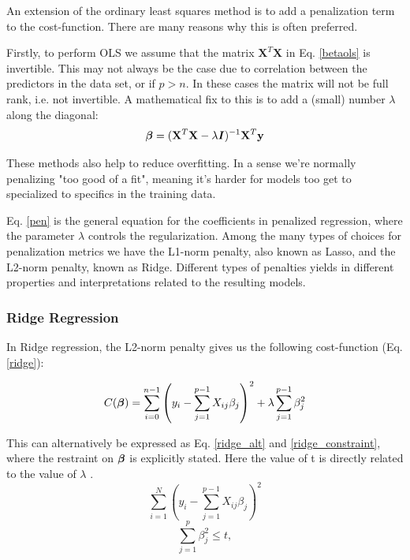 An extension of the ordinary least squares method is to add a penalization term to the cost-function. There are many reasons why this is often preferred. 

Firstly, to perform OLS we assume that the matrix $\boldsymbol{X}^T\boldsymbol{X}$ in Eq. \ref{betaols} is invertible. This may not always be the case due to correlation between the predictors in the data set, or if $p > n$. In these cases the matrix will not be full rank, i.e. not invertible. 
A mathematical fix to this is to add a (small) number $\lambda$ along the diagonal: 
\begin{equation}\label{pen}
    \boldsymbol{\beta} = (\mathbf{X}^T\mathbf{X}- \lambda\boldsymbol{I})^{-1}\mathbf{X}^T\mathbf{y}
\end{equation}

These methods also help to reduce overfitting.  In a sense we're normally penalizing "too good of a fit", meaning it's harder for models too get to specialized to specifics in the training data.

Eq. \ref{pen} is the general equation for the coefficients in penalized regression, where the parameter $\lambda$ controls the regularization. Among the many types of choices for penalization metrics we have the L1-norm penalty, also known as Lasso, and the L2-norm penalty, known as Ridge. Different types of penalties yields in different properties and interpretations related to the resulting models.

\subsubsection{Ridge Regression}\label{ridge_sec}

In Ridge regression, the L2-norm penalty gives us the following cost-function (Eq. \ref{ridge}):

\begin{equation}\label{ridge}
     C(\boldsymbol{\beta}) = \sum_{i=0}^{n-1} \left( y_i - \sum_{j=1}^{p-1} X_{ij}\beta_j \right)^2 + \lambda\sum_{j=1}^{p-1} \beta_j^2 
\end{equation}




This can alternatively be expressed as Eq. \ref{ridge_alt} and \ref{ridge_constraint}, where the restraint on $\boldsymbol{\beta}$ is explicitly stated. Here the value of t is directly related to the value of $\lambda$ \citep[p. 63]{hastie}.
\begin{equation}\label{ridge_alt}
    \sum_{i=1}^N \left(y_i - \sum_{j=1}^{p-1} X_{ij}\beta_j \right)^2
\end{equation}
\begin{equation}\label{ridge_constraint}
    \sum_{j=1}^p \beta_j^2 \leq t, 
\end{equation}

